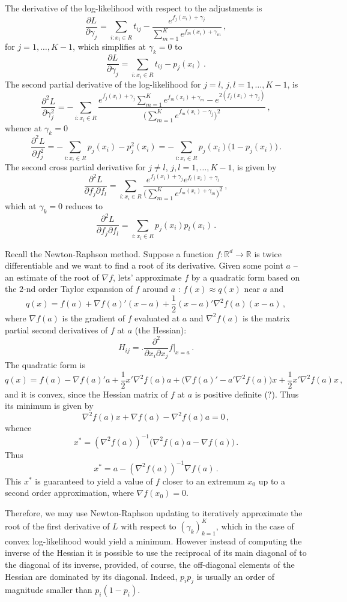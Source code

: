 \documentclass[a4paper]{article}
\newcommand{\Real}{\mathbb{R}}
\begin{document}
The derivative of the log-likelihood with respect to the adjustments is
\[
\frac{\partial L}{\partial \gamma_j}
= \sum_{i:x_i\in R} t_{ij} - \frac{e^{f_j(x_i)+\gamma_j}}{\sum_{m=1}^K e^{f_m(x_i)+\gamma_m}}\,,
\]
for $j=1,\ldots, K-1$, which simplifies at $\gamma_k = 0$ to 
\[ \frac{\partial L}{\partial \gamma_j} = \sum_{i:x_i\in R} t_{ij} - p_j(x_i)\,. \]
The second partial derivative of the log-likelihood for $j=l$, $j,l=1,\ldots, K-1$, is
\[
\frac{\partial^2 L}{\partial \gamma_j^2}
= - \sum_{i:x_i\in R} \frac{e^{f_j(x_i) + \gamma_j }\sum_{m=1}^K e^{f_m(x_i) + \gamma_m }
	- e^{2(f_j(x_i) + \gamma_j)} }{\bigl(\sum_{m=1}^K e^{f_m(x_i) - \gamma_j}\bigr)^2}\,,
\]
whence at $\gamma_k=0$
\[
\frac{\partial^2 L}{\partial f_j^2}
= - \sum_{i:x_i\in R} p_j(x_i) - p_j^2(x_i)
= - \sum_{i:x_i\in R} p_j(x_i) \bigl(1 - p_j(x_i)\bigr)\,.
\]
The second cross partial derivative for $j\neq l$, $j,l=1,\ldots, K-1$, is given by
\[
\frac{\partial^2 L}{\partial f_j \partial f_l}
= \sum_{i:x_i\in R} \frac{e^{f_j(x_i)+\gamma_j}e^{f_l(x_i)+\gamma_l}}{\bigl(\sum_{m=1}^K e^{f_m(x_i)+\gamma_m}\bigr)^2}\,,
\]
which at $\gamma_k=0$ reduces to
\[
\frac{\partial^2 L}{\partial f_j \partial f_l}
= \sum_{i:x_i\in R} p_j(x_i) p_l(x_i)\,.
\]

Recall the Newton-Raphson method. Suppose a function $f:\Real^d\to\Real$ is twice
differentiable and we want to find a root of its derivative. Given some point $a$
-- an estimate of the root of $\nabla f$, lets' approximate $f$ by a quadratic form
based on the $2$-nd order Taylor expansion of $f$ around $a$ : $f(x) \approx q(x)$
near $a$ and
\[
q(x) = f(a) + \nabla f(a)'(x-a) + \frac{1}{2}(x-a)'\nabla^2 f(a) (x-a)\,,
\]
where $\nabla f(a)$ is the gradient of $f$ evaluated at $a$ and $\nabla^2 f(a)$ is
the matrix partial second derivatives of $f$ at $a$ (the Hessian):
\[
H_{ij} = \biggl. \frac{\partial^2}{\partial x_i \partial x_j} f\biggr\rvert_{x=a}\,.
\]
The quadratic form is 
\[
q(x) = f(a) - \nabla f(a)'a + \frac{1}{2}x'\nabla^2 f(a) a
+ \bigl( \nabla f(a)' - a'\nabla^2 f(a) \bigr)x + \frac{1}{2}x'\nabla^2 f(a) x\,,
\]
and it is convex, since the Hessian matrix of $f$ at $a$ is positive definite (?).
Thus its minimum is given by
\[ \nabla^2 f(a) x + \nabla f(a) - \nabla^2 f(a) a = 0\,,\]
whence
\[ x^* = (\nabla^2 f(a))^{-1} \bigl( \nabla^2 f(a) a - \nabla f(a)\bigl)\,.\]
Thus
\[
x^* = a - (\nabla^2 f(a))^{-1}\nabla f(a)\,.
\]
This $x^*$ is guaranteed to yield a value of $f$ closer to an extremum $x_0$ up to a
second order approximation, where $\nabla f(x_0)=0$.

Therefore, we may use Newton-Raphson updating to iteratively approximate the root of
the first derivative of $L$ with respect to $(\gamma_k)_{k=1}^K$, which in the case of
convex log-likelihood would yield a minimum. However instead of computing the inverse
of the Hessian it is possible to use the reciprocal of its main diagonal of to the diagonal
of its inverse, provided, of course, the off-diagonal elements of the Hessian are
dominated by its diagonal. Indeed, $p_i p_j$ is usually an order of magnitude smaller
than $p_i (1-p_i)$.
\end{document}
